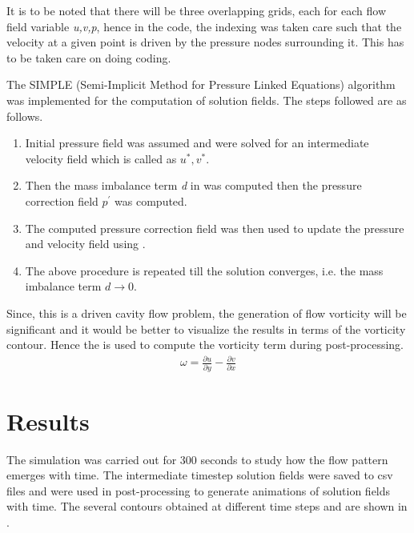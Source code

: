 \par It is to be noted that there will be three overlapping grids, each for each
flow field variable \emph{u,v,p}, hence in the code, the indexing was taken care
such that the velocity at a given point is driven by the pressure nodes surrounding
it. This has to be taken care on doing coding. \\

\par The SIMPLE (Semi-Implicit Method for Pressure Linked Equations) algorithm
was implemented for the computation of solution fields. The steps followed are
as follows.
\begin{enumerate}
    \item Initial pressure field was assumed and  were
        solved for an intermediate velocity field which is called as \(u^*, v^*\).
    \item Then the mass imbalance term \emph{d} in  was computed then the pressure
        correction field \(p^{\prime}\) was computed.
    \item The computed pressure correction field was then used to update the
        pressure and velocity field using .
    \item The above procedure is repeated till the solution converges, i.e. the
        mass imbalance term \(d \rightarrow 0\).
\end{enumerate}

\par Since, this is a driven cavity flow problem, the generation of flow
vorticity will be significant and it would be better to visualize the results
in terms of the vorticity contour. Hence the  is used to
compute the vorticity term during post-processing.
\begin{align}
    \omega = \frac{\partial u}{\partial y} - \frac{\partial v}{\partial x} \label{vorticity_eqn}
\end{align}

\pagebreak

\section{Results}
\par The simulation was carried out for 300 seconds to study how the flow pattern
emerges with time. The intermediate timestep solution fields were saved to
csv files and were used in post-processing to generate animations of solution
fields with time. The several contours obtained at different time steps and are
shown in .


